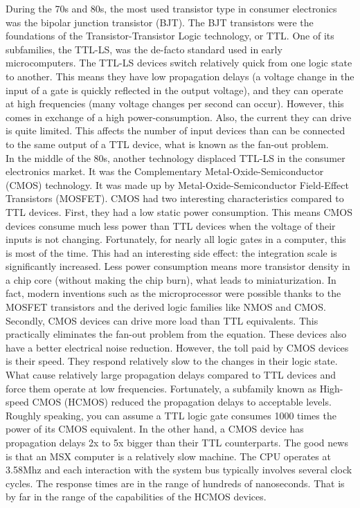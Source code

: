 During the 70s and 80s, the most used transistor type in consumer electronics was the bipolar junction transistor (BJT). The BJT transistors were the foundations of the Transistor-Transistor Logic technology, or TTL. One of its subfamilies, the TTL-LS, was the de-facto standard used in early microcomputers. The TTL-LS devices switch relatively quick from one logic state to another. This means they have low propagation delays (a voltage change in the input of a gate is quickly reflected in the output voltage), and they can operate at high frequencies (many voltage changes per second can occur). However, this comes in exchange of a high power-consumption. Also, the current they can drive is quite limited. This affects the number of input devices than can be connected to the same output of a TTL device, what is known as the fan-out problem.\\

In the middle of the 80s, another technology displaced TTL-LS in the consumer electronics market. It was the Complementary Metal-Oxide-Semiconductor (CMOS) technology. It was made up by Metal-Oxide-Semiconductor Field-Effect Transistors (MOSFET). CMOS had two interesting characteristics compared to TTL devices. First, they had a low static power consumption. This means CMOS devices consume much less power than TTL devices when the voltage of their inputs is not changing. Fortunately, for nearly all logic gates in a computer, this is most of the time. This had an interesting side effect: the integration scale is significantly increased. Less power consumption means more transistor density in a chip core (without making the chip burn), what leads to miniaturization. In fact, modern inventions such as the microprocessor were possible thanks to the MOSFET transistors and the derived logic families like NMOS and CMOS. Secondly, CMOS devices can drive more load than TTL equivalents. This practically eliminates the fan-out problem from the equation. These devices also have a better electrical noise reduction. However, the toll paid by CMOS devices is their speed. They respond relatively slow to the changes in their logic state. What cause relatively large propagation delays compared to TTL devices and force them operate at low frequencies. Fortunately, a subfamily known as High-speed CMOS (HCMOS) reduced the propagation delays to acceptable levels. \\

Roughly speaking, you can assume a TTL logic gate consumes 1000 times the power of its CMOS equivalent. In the other hand, a CMOS device has propagation delays 2x to 5x bigger than their TTL counterparts. The good news is that an MSX computer is a relatively slow machine. The CPU operates at 3.58Mhz and each interaction with the system bus typically involves several clock cycles. The response times are in the range of hundreds of nanoseconds. That is by far in the range of the capabilities of the HCMOS devices. \\


